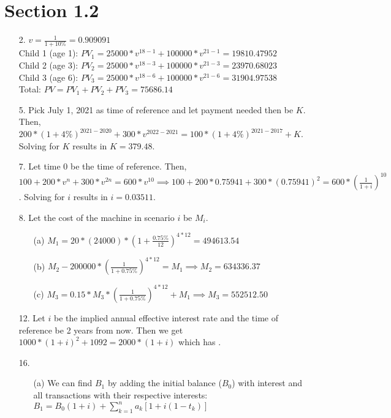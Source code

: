 \documentclass{article}
\begin{document}
\section*{Section 1.2}
\begin{itemize}
      \item [2.]
            $v=\frac{1}{1+10\%}=0.909091$\\
            Child 1 (age 1): $PV_1=25000*v^{18-1}+100000*v^{21-1}=19810.47952$\\
            Child 2 (age 3): $PV_2=25000*v^{18-3}+100000*v^{21-3}=23970.68023$\\
            Child 3 (age 6): $PV_3=25000*v^{18-6}+100000*v^{21-6}=31904.97538$\\
            Total: $PV=PV_1+PV_2+PV_3=\boxed{75686.14}$
      \item [5.]
            Pick July 1, 2021 as time of reference and let payment needed then be $K$. Then, $200*(1+4\%)^{2021-2020}+300*v^{2022-2021}=100*(1+4\%)^{2021-2017}+K$. Solving for $K$ results in $\boxed{K=379.48}$.
      \item [7.]
            Let time 0 be the time of reference. Then, $100+200*v^n+300*v^{2n}=600*v^{10} \implies 100+200*0.75941+300*(0.75941)^2=600*(\frac{1}{1+i})^{10}$. Solving for $i$ results in $\boxed{i=0.03511}$.
      \item [8.]
            Let the cost of the machine in scenario $i$ be $M_i$.
            \begin{itemize}
                  \item [(a)] $M_1=20*(24000)*(1+\frac{0.75\%}{12})^{4*12}=\boxed{494613.54}$
                  \item [(b)] $M_2-200000*(\frac{1}{1+0.75\%})^{4*12}=M_1 \implies M_2=\boxed{634336.37}$
                  \item [(c)] $M_3=0.15*M_3*(\frac{1}{1+0.75\%})^{4*12}+M_1 \implies M_3=\boxed{552512.50}$
            \end{itemize}
      \item [12.]
            Let $i$ be the implied annual effective interest rate and the time of reference be 2 years from now. Then we get $1000*(1+i)^2+1092=2000*(1+i)$ which has .
      \item [16.]
            \begin{itemize}
                  \item [(a)] We can find $B_1$ by adding the initial balance ($B_0$) with interest and all transactions with their respective interests: $\boxed{B_1=B_0(1+i)+\sum_{k=1}^{n}a_k[1+i(1-t_k)]}$

\end{itemize}
\end{itemize}
\end{document}
